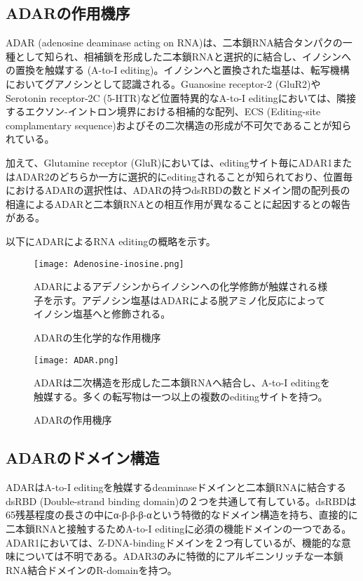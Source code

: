 \subsection{ADARの作用機序}
ADAR (adenosine deaminase acting on RNA)は、二本鎖RNA結合タンパクの一種として知られ、相補鎖を形成した二本鎖RNAと選択的に結合し、イノシンへの置換を触媒する (A-to-I editing)。イノシンへと置換された塩基は、転写機構においてグアノシンとして認識される。Guanosine receptor-2 (GluR2)やSerotonin receptor-2C (5-HTR)など位置特異的なA-to-I editingにおいては、隣接するエクソン-イントロン境界における相補的な配列、ECS (Editing-site complamentary sequence)およびその二次構造の形成が不可欠であることが知られている。
\par
加えて、Glutamine receptor (GluR)においては、editingサイト毎にADAR1またはADAR2のどちらか一方に選択的にeditingされることが知られており、位置毎におけるADARの選択性は、ADARの持つdsRBDの数とドメイン間の配列長の相違によるADARと二本鎖RNAとの相互作用が異なることに起因するとの報告がある。

以下にADARによるRNA editingの概略を示す。
\begin{figure}[htbp]
	\begin{center}
		\texttt{[image: Adenosine-inosine.png]}
	\end{center}
	\caption{ADARの生化学的な作用機序}
	\begin{flushleft}
		\normalsize{ADARによるアデノシンからイノシンへの化学修飾が触媒される様子を示す。アデノシン塩基はADARによる脱アミノ化反応によってイノシン塩基へと修飾される。}
	\end{flushleft}
	\label{fig:Chemical_reaction}
\end{figure}

\begin{figure}[htbp]
	\begin{center}
		\texttt{[image: ADAR.png]}
	\end{center}
	\caption{ADARの作用機序}
	\begin{flushleft}
		\normalsize{ADARは二次構造を形成した二本鎖RNAへ結合し、A-to-I editingを触媒する。多くの転写物は一つ以上の複数のeditingサイトを持つ。}
	\end{flushleft}
\end{figure}

\subsection{ADARのドメイン構造}
ADARはA-to-I editingを触媒するdeaminaseドメインと二本鎖RNAに結合するdsRBD (Double-strand binding domain)の２つを共通して有している。dsRBDは65残基程度の長さの中にα-β-β-β-αという特徴的なドメイン構造を持ち、直接的に二本鎖RNAと接触するためA-to-I editingに必須の機能ドメインの一つである。ADAR1においては、Z-DNA-bindingドメインを２つ有しているが、機能的な意味については不明である。ADAR3のみに特徴的にアルギニンリッチな一本鎖RNA結合ドメインのR-domainを持つ。

